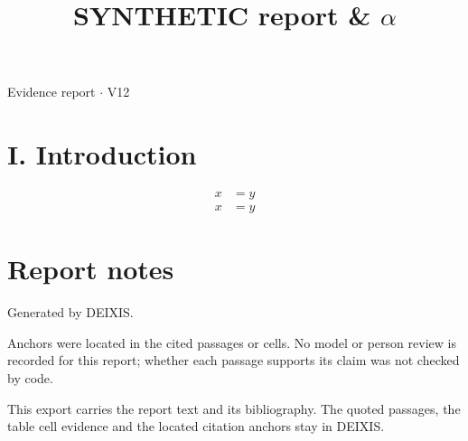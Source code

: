 \documentclass[journal]{IEEEtran}
\begin{document}
\title{SYNTHETIC report \& \ensuremath{\alpha}}

\maketitle

\noindent Evidence report \ensuremath{\cdot} V12

\section*{I. Introduction}

\begin{align}x&=y\end{align}
\cite{Synth26}
\begin{align}x&=y\end{align}
\cite{Synth26}

\section*{Report notes}

Generated by DEIXIS.

Anchors were located in the cited passages or cells. No model or person review is recorded for this report; whether each passage supports its claim was not checked by code.

This export carries the report text and its bibliography. The quoted passages, the table cell evidence and the located citation anchors stay in DEIXIS.




\end{document}
